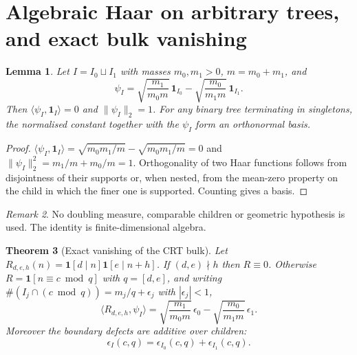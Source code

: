 \documentclass[11pt]{amsart}
\numberwithin{equation}{section}
\theoremstyle{plain}
\newtheorem{theorem}{Theorem}[section]
\newtheorem{lemma}[theorem]{Lemma}
\theoremstyle{definition}
\theoremstyle{remark}
\newtheorem{remark}[theorem]{Remark}
\begin{document}
\section{Algebraic Haar on arbitrary trees, and exact bulk vanishing}
\label{sec:haar}

\begin{lemma}
\label{lem:haar_basis}
Let $I=I_0\sqcup I_1$ with masses $m_0,m_1>0$, $m=m_0+m_1$, and
\begin{equation}
\psi_I=\sqrt{\frac{m_1}{m_0m}}\,\mathbf 1_{I_0}
-\sqrt{\frac{m_0}{m_1m}}\,\mathbf 1_{I_1}.
\label{eq:haar_function}
\end{equation}
Then $\langle\psi_I,\mathbf 1_I\rangle=0$ and $\|\psi_I\|_2=1$. For any
binary tree terminating in singletons, the normalised constant together
with the $\psi_I$ form an orthonormal basis.
\end{lemma}

\begin{proof}
$\langle\psi_I,\mathbf 1_I\rangle
=\sqrt{m_0m_1/m}-\sqrt{m_0m_1/m}=0$ and
$\|\psi_I\|_2^2=m_1/m+m_0/m=1$. Orthogonality of two Haar functions
follows from disjointness of their supports or, when nested, from the
mean-zero property on the child in which the finer one is supported.
Counting gives a basis.
\end{proof}

\begin{remark}
\label{rem:no_regularity}
No doubling measure, comparable children or geometric hypothesis is
used. The identity is finite-dimensional algebra.
\end{remark}

\begin{theorem}[Exact vanishing of the CRT bulk]
\label{thm:haar_crt}
Let $R_{d,e,h}(n)=\mathbf 1[d\mid n]\mathbf 1[e\mid n+h]$. If
$(d,e)\nmid h$ then $R\equiv0$. Otherwise $R=\mathbf 1[n\equiv c\bmod q]$
with $q=[d,e]$, and writing
$\#(I_j\cap(c\bmod q))=m_j/q+\epsilon_j$ with $|\epsilon_j|<1$,
\begin{equation}
\langle R_{d,e,h},\psi_I\rangle
=\sqrt{\frac{m_1}{m_0m}}\,\epsilon_0-\sqrt{\frac{m_0}{m_1m}}\,\epsilon_1 .
\label{eq:haar_crt}
\end{equation}
Moreover the boundary defects are additive over children:
\begin{equation}
\epsilon_I(c,q)=\epsilon_{I_0}(c,q)+\epsilon_{I_1}(c,q).
\label{eq:cocycle_additivity}
\end{equation}
\end{theorem}
\end{document}
